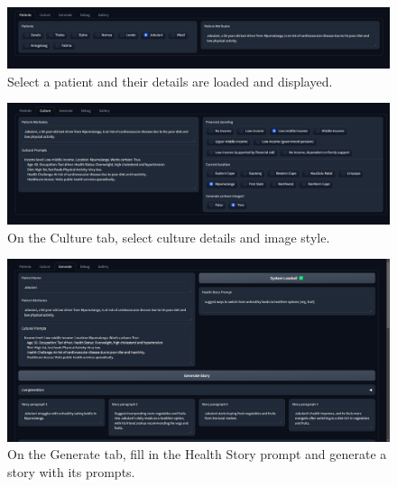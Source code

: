 

\begin{figure}[H]
	\centering
	\includegraphics[width=1.0\textwidth]{./graphics/t1.png}
	\caption[System design image pending.]{
Select a patient and their details are loaded and displayed.
	\label{fig:system_design}
	}
\end{figure}

\begin{figure}[H]
	\centering
	\includegraphics[width=1.0\textwidth]{./graphics/t2.png}
	\caption[System design image pending.]{
On the Culture tab, select culture details and image style.
	\label{fig:system_design}
	}
\end{figure}

\begin{figure}[H]
	\centering
	\includegraphics[width=1.0\textwidth]{./graphics/t3.png}
	\caption[System design image pending.]{
On the Generate tab, fill in the Health Story prompt and generate a story with its prompts.
	\label{fig:system_design}
	}
\end{figure}

